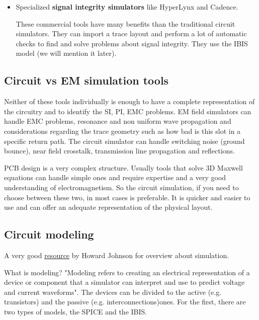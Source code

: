 \documentclass[12pt]{article}
\begin{document}
\begin{itemize}
	\item Specialized \textbf{signal integrity simulators} like HyperLynx and Cadence.
	
	These commercial tools have many benefits than the traditional circuit simulators. They can import a trace layout and perform a lot of automatic checks to find and solve problems about signal integrity. They use the IBIS model (we will mention it later).
\end{itemize}

\subsection{Circuit vs EM simulation tools}

Neither of these tools individually is enough to have a complete representation of the circuitry and to identify the SI, PI, EMC problems. EM field simulators can handle EMC problems, resonance and non uniform wave propagation and considerations regarding the trace geometry such as how bad is this slot in a specific return path. The circuit simulator can handle switching noise (ground bounce), near field crosstalk, transmission line propagation and reflections.	

PCB design is a very complex structure. Usually tools that solve 3D Maxwell equations can handle simple ones and require expertise and a very good understanding of electromagnetism. So the circuit simulation, if you need to choose between these two, in most cases is preferable. It is quicker and easier to use and can offer an adequate representation of the physical layout.

\subsection{Circuit modeling}

A very good \href{http://www.sigcon.com/Pubs/straight/planningsi.htm}{resource} by Howard Johnson for overview about simulation.

What is modeling? "Modeling refers to creating an electrical representation of a device or component that a simulator can interpret and use to predict voltage and current waveforms". The devices can be divided to the active (e.g. transistors) and the passive (e.g. interconnections)ones. For the first, there are two types of models, the SPICE and the IBIS.
\end{document}
